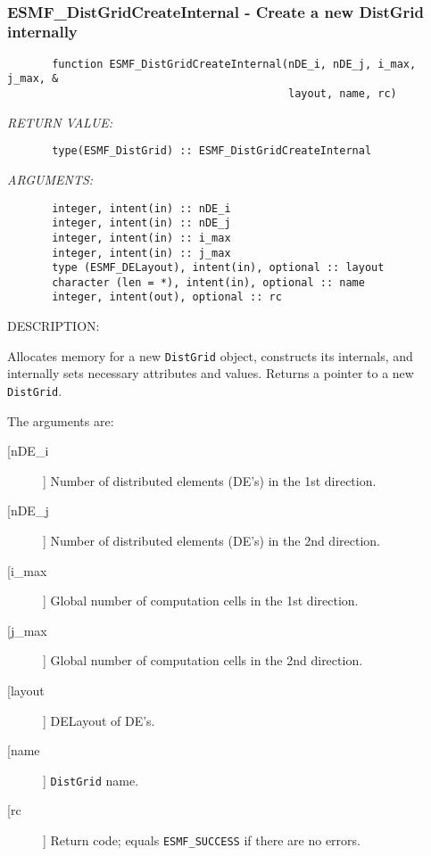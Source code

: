  
\mbox{}\hrulefill\ 
 
\subsubsection{ESMF\_DistGridCreateInternal - Create a new DistGrid internally}


\begin{verbatim}       function ESMF_DistGridCreateInternal(nDE_i, nDE_j, i_max, j_max, &
                                            layout, name, rc)\end{verbatim}{\em RETURN VALUE:}
\begin{verbatim}       type(ESMF_DistGrid) :: ESMF_DistGridCreateInternal\end{verbatim}{\em ARGUMENTS:}
\begin{verbatim}       integer, intent(in) :: nDE_i
       integer, intent(in) :: nDE_j
       integer, intent(in) :: i_max
       integer, intent(in) :: j_max
       type (ESMF_DELayout), intent(in), optional :: layout
       character (len = *), intent(in), optional :: name  
       integer, intent(out), optional :: rc               
 \end{verbatim}
{\sf DESCRIPTION:\\ }


       Allocates memory for a new {\tt DistGrid} object, constructs its
       internals, and internally sets necessary attributes and values.
       Returns a pointer to a new {\tt DistGrid}.
  
       The arguments are:
       \begin{description}
       \item[[nDE\_i]] 
            Number of distributed elements (DE's) in the 1st direction.
       \item[[nDE\_j]] 
            Number of distributed elements (DE's) in the 2nd direction.
       \item[[i\_max]] 
            Global number of computation cells in the 1st direction.
       \item[[j\_max]] 
            Global number of computation cells in the 2nd direction.
       \item[[layout]]
            DELayout of DE's.
       \item[[name]] 
            {\tt DistGrid} name.
       \item[[rc]] 
            Return code; equals {\tt ESMF\_SUCCESS} if there are no errors.
     \end{description}
  
